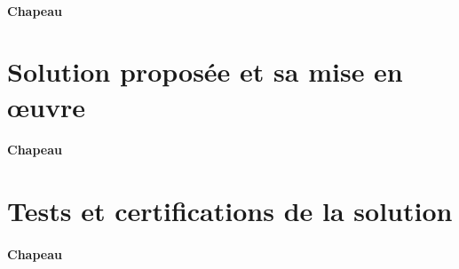 \paragraph{Chapeau}


\section{Solution proposée et sa mise en œuvre} \label{sec:solution2}

\paragraph{Chapeau}


\section{Tests et certifications de la solution} \label{sec:test2}

\paragraph{Chapeau}

